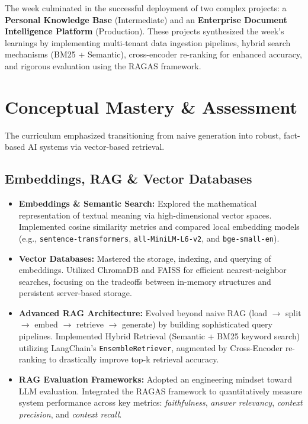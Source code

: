\documentclass[12pt, a4paper]{article}
\begin{document}
The week culminated in the successful deployment of two complex projects: a \textbf{Personal Knowledge Base} (Intermediate) and an \textbf{Enterprise Document Intelligence Platform} (Production). These projects synthesized the week's learnings by implementing multi-tenant data ingestion pipelines, hybrid search mechanisms (BM25 + Semantic), cross-encoder re-ranking for enhanced accuracy, and rigorous evaluation using the RAGAS framework.

\section{Conceptual Mastery \& Assessment}
The curriculum emphasized transitioning from naive generation into robust, fact-based AI systems via vector-based retrieval.

\subsection{Embeddings, RAG \& Vector Databases}
\begin{itemize}[label=\textcolor{secondary}{$\bullet$}]
    \item \textbf{Embeddings \& Semantic Search:} Explored the mathematical representation of textual meaning via high-dimensional vector spaces. Implemented cosine similarity metrics and compared local embedding models (e.g., \texttt{sentence-transformers}, \texttt{all-MiniLM-L6-v2}, and \texttt{bge-small-en}).
    \item \textbf{Vector Databases:} Mastered the storage, indexing, and querying of embeddings. Utilized ChromaDB and FAISS for efficient nearest-neighbor searches, focusing on the tradeoffs between in-memory structures and persistent server-based storage.
    \item \textbf{Advanced RAG Architecture:} Evolved beyond naive RAG (load $\rightarrow$ split $\rightarrow$ embed $\rightarrow$ retrieve $\rightarrow$ generate) by building sophisticated query pipelines. Implemented Hybrid Retrieval (Semantic + BM25 keyword search) utilizing LangChain's \texttt{EnsembleRetriever}, augmented by Cross-Encoder re-ranking to drastically improve top-k retrieval accuracy.
    \item \textbf{RAG Evaluation Frameworks:} Adopted an engineering mindset toward LLM evaluation. Integrated the RAGAS framework to quantitatively measure system performance across key metrics: \textit{faithfulness}, \textit{answer relevancy}, \textit{context precision}, and \textit{context recall}.
\end{itemize}
\end{document}

